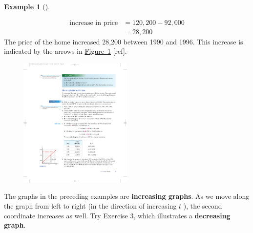 \documentclass[10pt,]{book}
\newcommand{\terminology}[1]{\textbf{#1}}
\theoremstyle{plain}
\theoremstyle{definition}
\theoremstyle{definition}
\theoremstyle{definition}
\newtheorem{example}[theorem]{Example}
\theoremstyle{definition}
\theoremstyle{definition}
\numberwithin{equation}{section}
\newcommand{\amp}{ & }
\begin{document}
\begin{example}[]
\begin{enumerate}[label=*\alph**]
            \begin{align*}
\text{increase in price}\amp=120,200-92,000
                \\
\amp=28,200
\end{align*}  
            The price of the home increased \textdollar{}28,200 between 1990 and 1996.  This increase is indicated by the arrows in \hyperref[fig-median-house]{Figure~\ref{fig-median-house}} [ref].%
\leavevmode%
\begin{figure}
\centering
\includegraphics[width=0.50\textwidth,]{images/fig1-3.pdf}\caption{\label{fig-median-house}}
\end{figure}
\end{enumerate}
\end{example}
\par
The graphs in the preceding examples are \terminology{increasing graphs}.  As we move along the graph from left to right (in the direction of increasing \(t\) ), the second coordinate increases as well.  Try Exercise 3, which illustrates a \terminology{decreasing graph}.%
\end{document}
